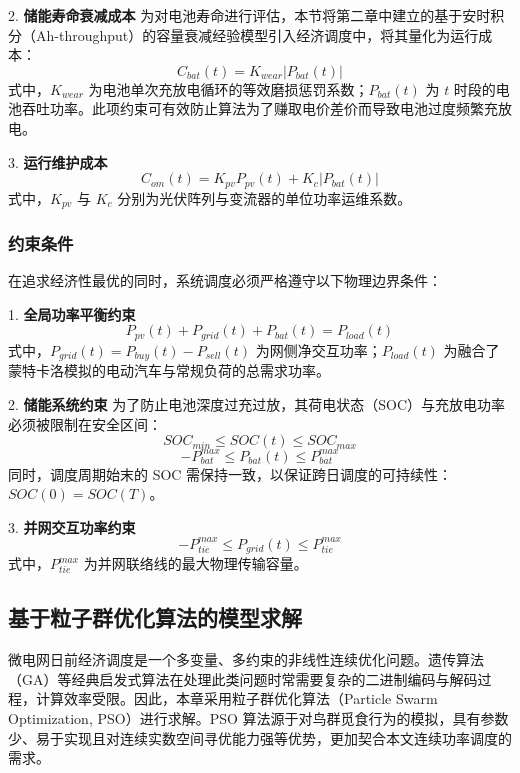 2. \textbf{储能寿命衰减成本}
为对电池寿命进行评估，本节将第二章中建立的基于安时积分（Ah-throughput）的容量衰减经验模型引入经济调度中，将其量化为运行成本：
\begin{equation}
    C_{bat}(t) = K_{wear} |P_{bat}(t)|
\end{equation}
式中，$K_{wear}$ 为电池单次充放电循环的等效磨损惩罚系数；$P_{bat}(t)$ 为 $t$ 时段的电池吞吐功率。此项约束可有效防止算法为了赚取电价差价而导致电池过度频繁充放电。

3. \textbf{运行维护成本}
\begin{equation}
    C_{om}(t) = K_{pv} P_{pv}(t) + K_{c} |P_{bat}(t)|
\end{equation}
式中，$K_{pv}$ 与 $K_{c}$ 分别为光伏阵列与变流器的单位功率运维系数。

\subsubsection{约束条件}
在追求经济性最优的同时，系统调度必须严格遵守以下物理边界条件：

1. \textbf{全局功率平衡约束}
\begin{equation}
    P_{pv}(t) + P_{grid}(t) + P_{bat}(t) = P_{load}(t)
\end{equation}
式中，$P_{grid}(t) = P_{buy}(t) - P_{sell}(t)$ 为网侧净交互功率；$P_{load}(t)$ 为融合了蒙特卡洛模拟的电动汽车与常规负荷的总需求功率。

2. \textbf{储能系统约束}
为了防止电池深度过充过放，其荷电状态（SOC）与充放电功率必须被限制在安全区间：
\begin{equation}
    SOC_{min} \le SOC(t) \le SOC_{max}
\end{equation}
\begin{equation}
    -P_{bat}^{max} \le P_{bat}(t) \le P_{bat}^{max}
\end{equation}
同时，调度周期始末的 SOC 需保持一致，以保证跨日调度的可持续性：$SOC(0) = SOC(T)$。

3. \textbf{并网交互功率约束}
\begin{equation}
    -P_{tie}^{max} \le P_{grid}(t) \le P_{tie}^{max}
\end{equation}
式中，$P_{tie}^{max}$ 为并网联络线的最大物理传输容量。

\subsection{基于粒子群优化算法的模型求解}
\label{sec:pso_algorithm}

微电网日前经济调度是一个多变量、多约束的非线性连续优化问题。遗传算法（GA）等经典启发式算法在处理此类问题时常需要复杂的二进制编码与解码过程，计算效率受限。因此，本章采用粒子群优化算法（Particle Swarm Optimization, PSO）进行求解。PSO 算法源于对鸟群觅食行为的模拟，具有参数少、易于实现且对连续实数空间寻优能力强等优势，更加契合本文连续功率调度的需求。

